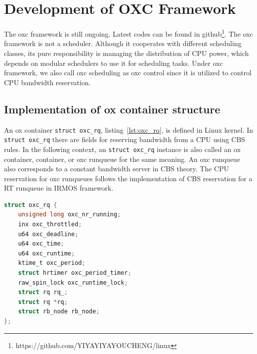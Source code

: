 \chapter{Development of OXC Framework\label{chap:impl}}
The oxc framework is still ongoing. Latest codes can be found 
in github\footnote{https://github.com/YIYAYIYAYOUCHENG/linux}.
The oxc framework is not a scheduler. Although it cooperates with
different scheduling classes, its pure responsibility is managing 
the distribution of CPU power, which depends on modular schedulers 
to use it for scheduling tasks. Under oxc framework, we also call
oxc scheduling as oxc control since it is utilized to control CPU 
bandwidth reservation.

\section{Implementation of ox container structure}
An ox container \texttt{struct oxc\_rq}, listing~\ref{lst:oxc_rq}, 
is defined in Linux kernel. In \texttt{struct oxc\_rq} there 
are fields for reserving bandwidth from a CPU using CBS rules. 
In the following context, an \texttt{struct oxc\_rq} instance is 
also called an ox container, container, or oxc runqueue for the 
same meaning. An oxc runqueue also corresponds to a constant 
bandwidth server in CBS theory. 
The CPU reservation for oxc runqueues follows the implementation 
of CBS reservation for a RT runqueue in IRMOS framework. 

\begin{lstlisting}[language=C, 
		caption={The ox container : \texttt{struct oxc\_rq}},
                        label={lst:oxc_rq}]
struct oxc_rq {
	unsigned long oxc_nr_running;
	inx oxc_throttled;
	u64 oxc_deadline;
	u64 oxc_time;
	u64 oxc_runtime;
	ktime_t oxc_period;
	struct hrtimer oxc_period_timer;
	raw_spin_lock oxc_runtime_lock;
	struct rq rq_;
	struct rq *rq;
	struct rb_node rb_node;
};
\end{lstlisting}

